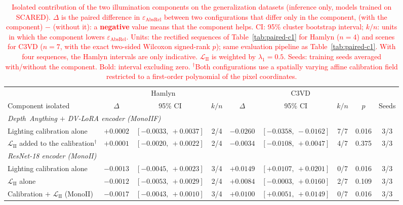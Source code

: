 \documentclass[a4paper,fleqn]{cas-dc}
\begin{document}
\begin{table}[t]
\centering
\color{red}
\caption{\textcolor{red}{Isolated contribution of the two illumination components on the generalization datasets (inference only, models trained on SCARED). $\Delta$ is the paired difference in $\varepsilon_\textrm{AbsRel}$ between two configurations that differ only in the component, (with the component) $-$ (without it): a \textbf{negative} value means that the component helps. CI: 95\% cluster bootstrap interval; $k/n$: units in which the component lowers $\varepsilon_\textrm{AbsRel}$. Units: the rectified sequences of Table~\ref{tab:paired-c1} for Hamlyn ($n=4$) and scenes for C3VD ($n=7$, with the exact two-sided Wilcoxon signed-rank $p$); same evaluation pipeline as Table~\ref{tab:paired-c1}. With four sequences, the Hamlyn intervals are only indicative. $\mathcal{L}_\textrm{II}$ is weighted by $\lambda_1=0.5$. Seeds: training seeds averaged with/without the component. Bold: interval excluding zero. $^{\dagger}$Both configurations use a spatially varying affine calibration field restricted to a first-order polynomial of the pixel coordinates.}}
\label{tab:components-crossdomain}
\small
\setlength{\tabcolsep}{5pt}
\begin{tabular}{l rcc rccc c}
\toprule
 & \multicolumn{3}{c}{Hamlyn} & \multicolumn{4}{c}{C3VD} & \\
\cmidrule(lr){2-4}\cmidrule(lr){5-8}
Component isolated & \multicolumn{1}{c}{$\Delta$} & 95\% CI & $k/n$ & \multicolumn{1}{c}{$\Delta$} & 95\% CI & $k/n$ & $p$ & Seeds \\
\midrule
\multicolumn{9}{l}{\emph{Depth~Anything $+$ DV-LoRA encoder (MonoIIF)}} \\
\quad Lighting calibration alone & $+0.0002$ & $[-0.0033,\ +0.0037]$ & 2/4 & $\mathbf{-0.0260}$ & $[-0.0358,\ -0.0162]$ & 7/7 & 0.016 & 3/3 \\
\quad $\mathcal{L}_\textrm{II}$ added to the calibration$^{\dagger}$ & $+0.0001$ & $[-0.0020,\ +0.0022]$ & 2/4 & $-0.0034$ & $[-0.0108,\ +0.0047]$ & 4/7 & 0.375 & 3/3 \\
\midrule
\multicolumn{9}{l}{\emph{ResNet-18 encoder (MonoII)}} \\
\quad Lighting calibration alone & $-0.0013$ & $[-0.0045,\ +0.0023]$ & 3/4 & $\mathbf{+0.0149}$ & $[+0.0107,\ +0.0201]$ & 0/7 & 0.016 & 3/3 \\
\quad $\mathcal{L}_\textrm{II}$ alone & $-0.0012$ & $[-0.0053,\ +0.0029]$ & 2/4 & $+0.0084$ & $[-0.0003,\ +0.0160]$ & 2/7 & 0.109 & 3/3 \\
\quad Calibration $+$ $\mathcal{L}_\textrm{II}$ (MonoII) & $-0.0017$ & $[-0.0043,\ +0.0010]$ & 3/4 & $\mathbf{+0.0100}$ & $[+0.0051,\ +0.0149]$ & 0/7 & 0.016 & 3/3 \\
\bottomrule
\end{tabular}
\end{table}
\end{document}
